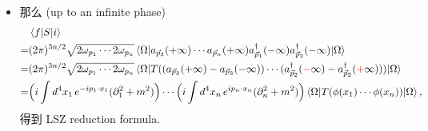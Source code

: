 \begin{itemize}
	\item 那么 (up to an infinite phase)
	\begin{align}
		& \braket{f | S | i} \notag \\
		=& (2 \pi)^{3 n / 2} \sqrt{2 \omega_{p_1} \cdots 2 \omega_{p_n}} \braket{\Omega | a_{\vec{p}_3}(+ \infty) \cdots a_{\vec{p}_n}(+ \infty) a^\dag_{\vec{p}_1}(- \infty) a^\dag_{\vec{p}_2}(- \infty) | \Omega} \notag \\
		=& (2 \pi)^{3 n / 2} \sqrt{2 \omega_{p_1} \cdots 2 \omega_{p_n}} \braket{\Omega | T ((a_{\vec{p}_3}(+ \infty) - a_{\vec{p}_3}(- \infty)) \cdots (a^\dag_{\vec{p}_2}(\mathcolor{red}{-} \infty) - a^\dag_{\vec{p}_2}(\mathcolor{red}{+} \infty))) | \Omega} \notag \\
		=& \Big( i \int d^4 x_1 \, e^{- i p_1 \cdot x_1} (\partial_1^2 + m^2) \Big) \cdots \Big( i \int d^4 x_n \, e^{i p_n \cdot x_n} (\partial_n^2 + m^2) \Big) \braket{\Omega | T(\phi(x_1) \cdots \phi(x_n)) | \Omega},
	\end{align}
	得到 LSZ reduction formula.
\end{itemize}

